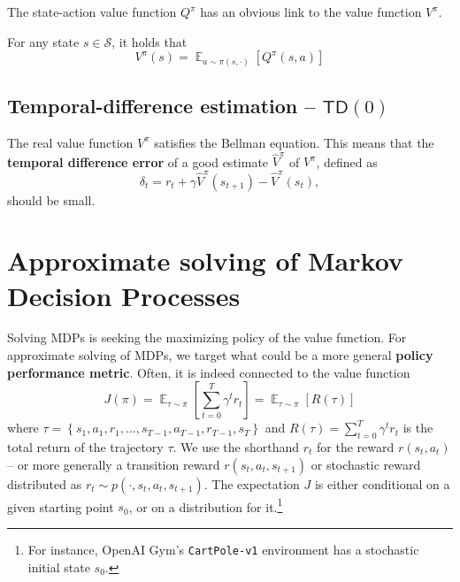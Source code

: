\documentclass[12pt]{report}
\DeclareMathOperator{\EE}{\mathbb{E}}
\newcommand{\calS}{\mathcal{S}}
\newcommand{\bluefont}{\color{Blue}}
\begin{document}
The state-action value function $Q^\pi$ has an obvious link to the value function $V^\pi$.

\begin{prop}\label{prop:ValueFunctionExpectationLink}
	For any state $s\in\calS$, it holds that
	\begin{equation}
	V^\pi(s) = \EE_{a\sim \pi(s,\cdot)}\left[
	Q^\pi(s, a)
	\right]
	\end{equation}
\end{prop}



\section{Temporal-difference estimation -- $\mathsf{TD}(0)$}

The real value function $V^\pi$ satisfies the Bellman equation. This means that the \textbf{\bluefont temporal difference error} of a good estimate $\widehat{V}^\pi$ of $V^\pi$, defined as
\[
	\delta_t = r_t + \gamma \widehat{V}^\pi(s_{t+1}) - \widehat{V}^\pi(s_t),
\]
should be small.






\chapter{Approximate solving of Markov Decision Processes}


Solving MDPs is seeking the maximizing policy of the value function. For approximate solving of MDPs, we target what could be a more general \textbf{\bluefont policy performance metric}. Often, it is indeed connected to the value function
\begin{equation}\label{eq:PolicyPerfCumReward}
J(\pi) = \EE_{\tau\sim\pi}\left[
	\sum_{t=0}^{T} \gamma^t r_t
\right] =
	\EE_{\tau\sim\pi}
	\left[R(\tau)\right]
\end{equation}
where $\tau = \left\{ s_1,a_1,r_1,\ldots,s_{T-1},a_{T-1},r_{T-1},s_{T}\right\}$ and $R(\tau) = \sum_{t=0}^T \gamma^t r_t$ is the total return of the trajectory $\tau$.
We use the shorthand $r_t$ for the reward $r(s_t, a_t)$ -- or more generally a transition reward $r(s_t, a_t, s_{t+1})$ or stochastic reward distributed as $r_t \sim p(\cdot, s_t, a_t, s_{t+1})$. The expectation $J$ is either conditional on a given starting point $s_0$, or on a distribution for it.\footnote{For instance, OpenAI Gym's \texttt{CartPole-v1} environment has a stochastic initial state $s_0$.}
\end{document}
